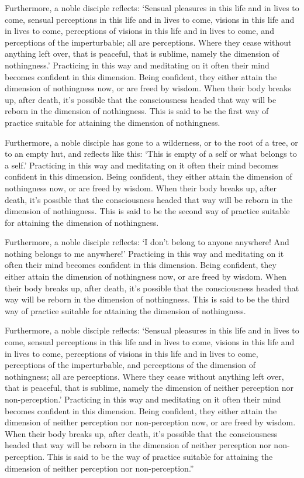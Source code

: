 \documentclass[12pt,openany]{book}%
\begin{document}
Furthermore, a noble disciple reflects: ‘Sensual pleasures in this life and in lives to come, sensual perceptions in this life and in lives to come, visions in this life and in lives to come, perceptions of visions in this life and in lives to come, and perceptions of the imperturbable; all are perceptions. Where they cease without anything left over, that is peaceful, that is sublime, namely the dimension of nothingness.’ Practicing in this way and meditating on it often their mind becomes confident in this dimension. Being confident, they either attain the dimension of nothingness now, or are freed by wisdom. When their body breaks up, after death, it’s possible that the consciousness headed that way will be reborn in the dimension of nothingness. This is said to be the first way of practice suitable for attaining the dimension of nothingness. 

Furthermore, a noble disciple has gone to a wilderness, or to the root of a tree, or to an empty hut, and reflects like this: ‘This is empty of a self or what belongs to a self.’ Practicing in this way and meditating on it often their mind becomes confident in this dimension. Being confident, they either attain the dimension of nothingness now, or are freed by wisdom. When their body breaks up, after death, it’s possible that the consciousness headed that way will be reborn in the dimension of nothingness. This is said to be the second way of practice suitable for attaining the dimension of nothingness. 

Furthermore, a noble disciple reflects: ‘I don’t belong to anyone anywhere! And nothing belongs to me anywhere!’ Practicing in this way and meditating on it often their mind becomes confident in this dimension. Being confident, they either attain the dimension of nothingness now, or are freed by wisdom. When their body breaks up, after death, it’s possible that the consciousness headed that way will be reborn in the dimension of nothingness. This is said to be the third way of practice suitable for attaining the dimension of nothingness. 

Furthermore, a noble disciple reflects: ‘Sensual pleasures in this life and in lives to come, sensual perceptions in this life and in lives to come, visions in this life and in lives to come, perceptions of visions in this life and in lives to come, perceptions of the imperturbable, and perceptions of the dimension of nothingness; all are perceptions. Where they cease without anything left over, that is peaceful, that is sublime, namely the dimension of neither perception nor non-perception.’ Practicing in this way and meditating on it often their mind becomes confident in this dimension. Being confident, they either attain the dimension of neither perception nor non-perception now, or are freed by wisdom. When their body breaks up, after death, it’s possible that the consciousness headed that way will be reborn in the dimension of neither perception nor non-perception. This is said to be the way of practice suitable for attaining the dimension of neither perception nor non-perception.” 
\end{document}
